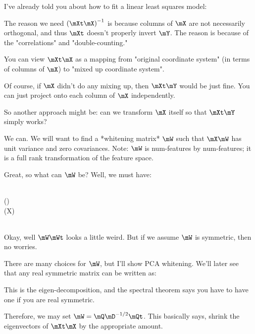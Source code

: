 I've already told you about how to fit a linear least squares model:

\begin{nedqn}
  \hat{\theta}
\eqcol
  \parensinv{\mXt \mX} \mXt \mY
\end{nedqn}

The reason we need $\parensinv{\mXt \mX}$ is because columns of $\mX$
are not necessarily orthogonal, and thus $\mXt$ doesn't properly invert
$\mY$. The reason is because of the "correlations" and "double-counting."

You can view $\mXt \mX$ as a mapping from "original coordinate
system" (in terms of columns of $\mX$) to "mixed up coordinate system".

Of course, if $\mX$ didn't do any mixing up, then $\mXt \mY$ would be
just fine. You can just project onto each column of $\mX$ independently.

So another approach might be: can we transform $\mX$ itself so that
$\mXt \mY$ simply works?

We can. We will want to find a *whitening matrix* $\mW$ such that
$\mX\mW$ has unit variance and zero covariances. Note: $\mW$ is
num-features by num-features; it is a full rank transformation of the
feature space.

Great, so what can $\mW$ be? Well, we must have:

\begin{nedqn}
  \parenstrans{\mX\mW} \mX\mW
\eqcol
  \mI
\\
  \mWt (\mXt \mX) \mW
\eqcol
  \mI
\\
  \mW \mWt (\mXt X) \mW
\eqcol
  \mW
\\
  \parens{\mW \mWt} \parens{\mXt \mX} \mI
\eqcol
  \mI
\\
  \parens{\mW \mWt}
\eqcol
  \parensinv{\mXt \mX}
\end{nedqn}

Okay, well $\mW \mWt$ looks a little weird. But if we assume $\mW$ is
symmetric, then no worries.

There are many choices for $\mW$, but I'll show PCA whitening. We'll
later see that any real symmetric matrix can be written as:

\begin{nedqn}
  \mXt \mX
\eqcol
  \mQ \mD \mQt
\end{nedqn}

This is the eigen-decomposition, and the spectral theorem says you
have to have one if you are real symmetric.

Therefore, we may set $\mW = \mQ \mD^{-1/2} \mQt$. This basically says,
shrink the eigenvectors of $\mXt \mX$ by the appropriate amount.

